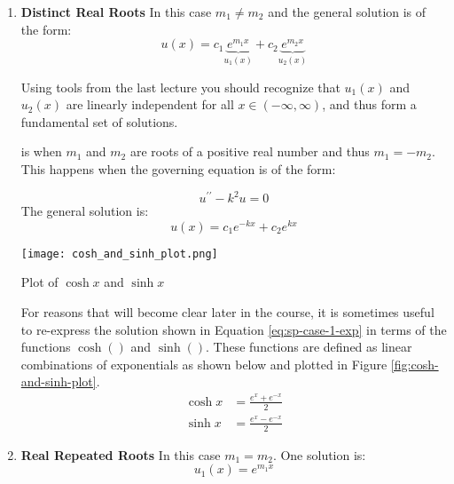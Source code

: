 \begin{enumerate}
\item \textbf{Distinct Real Roots}
In this case $m_1 \ne m_2$ and the general solution is of the form:
\begin{equation}
u(x) = c_1\underbrace{e^{m_1x}}_{u_1(x)}+c_2\underbrace{e^{m_2x}}_{u_2(x)}
\label{eq:dist-real-roots}
\end{equation}

Using tools from the last lecture you should recognize that $u_1(x)$ and $u_2(x)$ are linearly independent for all $x\in \left( -\infty,\infty\right)$, and thus form a fundamental set of solutions.  

 is when $m_1$ and $m_2$ are roots of a positive real number and thus $m_1 = -m_2$.  This happens when the governing equation is of the form:

\begin{equation}
u^{\prime \prime} - k^2 u = 0
\end{equation}
The general solution is:
\begin{equation}
u(x) = c_1 e^{-kx} + c_2e^{kx}
\label{eq:sp-case-1-exp}
\end{equation}
\begin{marginfigure}
\texttt{[image: cosh\_and\_sinh\_plot.png]}
\caption{Plot of $\cosh{x}$ and $\sinh{x}$}
\label{fig:cosh-and-sinh-plot}
\end{marginfigure}


For reasons that will become clear later in the course, it is sometimes useful to re-express the solution shown in Equation \ref{eq:sp-case-1-exp} in terms of the functions $\cosh{()}$ and $\sinh{()}$.  These functions are defined as linear combinations of exponentials as shown below and plotted in Figure \ref{fig:cosh-and-sinh-plot}.
\begin{align*}
\cosh{x} &= \frac{e^{x} + e^{-x}}{2} \\
\sinh{x} &= \frac{e^{x} - e^{-x}}{2}
\end{align*}



\item \textbf{Real Repeated Roots}
In this case $m_1 = m_2$.  One solution is:
\begin{equation}
u_1(x) = e^{m_1x}
\end{equation}


\end{enumerate}
